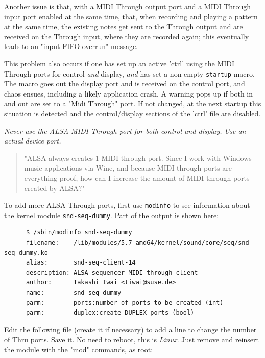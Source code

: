    Another issue is that, with a MIDI Through output port and a MIDI Through
   input port enabled at the same time, that, when recording and playing a
   pattern at the same time, the existing notes get sent to the Through output
   and are received on the Through input, where they are recorded again; this
   eventually leads to an "input FIFO overrun" message.

   This problem also occurs if one has set up an active 'ctrl'
   using the MIDI Through ports for control \textsl{and}
   display, \textsl{and} has set a non-empty \texttt{startup} macro.
   The macro goes out the display port and is received on the control
   port, and chaos ensues, including a likely application crash.
   A warning pops up if both in and out are set to a "Midi Through"
   port.
   If not changed, at the next startup this situation is detected and the
   control/display sections of the 'ctrl' file are disabled.

   \textsl{Never use the ALSA MIDI Through port for both control
   and display. Use an actual device port.}

   \begin{quote}
      "ALSA always creates 1 MIDI through port. Since I work with Windows music
      applications via Wine, and because MIDI through ports are
      everything-proof, how can I increase the amount of MIDI through ports
      created by ALSA?"
   \end{quote}

   To add more ALSA Through ports, first use \texttt{modinfo} to see
   information about the kernel module \texttt{snd-seq-dummy}.  Part of the
   output is shown here:

   \begin{verbatim}
      $ /sbin/modinfo snd-seq-dummy
      filename:    /lib/modules/5.7-amd64/kernel/sound/core/seq/snd-seq-dummy.ko
      alias:       snd-seq-client-14
      description: ALSA sequencer MIDI-through client
      author:      Takashi Iwai <tiwai@suse.de>
      name:        snd_seq_dummy
      parm:        ports:number of ports to be created (int)
      parm:        duplex:create DUPLEX ports (bool)
   \end{verbatim}

   Edit the following file (create it if necessary)
   to add a line to change the number
   of Thru ports.
   Save it.
   No need to reboot, this is \textsl{Linux}.
   Just remove and reinsert the module with the
   "mod" commands, as root:

